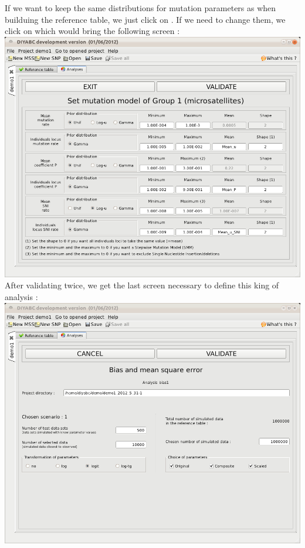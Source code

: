 If we want to keep the same distributions for mutation parameters as when builduing the reference table, we just click on . If we need to change them, we click on  which would bring the following screen :\\

\includegraphics[scale=0.35]{gui_pictures/Capture-DIYABC-48.png} \\

After validating twice, we get the last screen necessary to define this king of analysis :\\

\includegraphics[scale=0.35]{gui_pictures/Capture-DIYABC-49.png} \\
 

